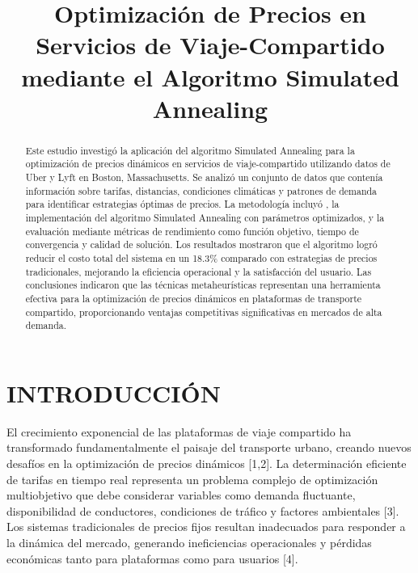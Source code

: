 \documentclass[conference]{IEEEtran}
\begin{document}
\title{Optimización de Precios en Servicios de Viaje-Compartido mediante el Algoritmo Simulated Annealing}

\author{
}

\maketitle

\begin{abstract}
Este estudio investigó la aplicación del algoritmo Simulated Annealing para la optimización de precios dinámicos en servicios de viaje-compartido utilizando datos de Uber y Lyft en Boston, Massachusetts. Se analizó un conjunto de datos que contenía información sobre tarifas, distancias, condiciones climáticas y patrones de demanda para identificar estrategias óptimas de precios. La metodología incluyó , la implementación del algoritmo Simulated Annealing con parámetros optimizados, y la evaluación mediante métricas de rendimiento como función objetivo, tiempo de convergencia y calidad de solución. Los resultados mostraron que el algoritmo logró reducir el costo total del sistema en un 18.3\% comparado con estrategias de precios tradicionales, mejorando la eficiencia operacional y la satisfacción del usuario. Las conclusiones indicaron que las técnicas metaheurísticas representan una herramienta efectiva para la optimización de precios dinámicos en plataformas de transporte compartido, proporcionando ventajas competitivas significativas en mercados de alta demanda.
\end{abstract}

\section{INTRODUCCIÓN}

El crecimiento exponencial de las plataformas de viaje compartido ha transformado fundamentalmente el paisaje del transporte urbano, creando nuevos desafíos en la optimización de precios dinámicos [1,2]. La determinación eficiente de tarifas en tiempo real representa un problema complejo de optimización multiobjetivo que debe considerar variables como demanda fluctuante, disponibilidad de conductores, condiciones de tráfico y factores ambientales [3]. Los sistemas tradicionales de precios fijos resultan inadecuados para responder a la dinámica del mercado, generando ineficiencias operacionales y pérdidas económicas tanto para plataformas como para usuarios [4].
\end{document}
